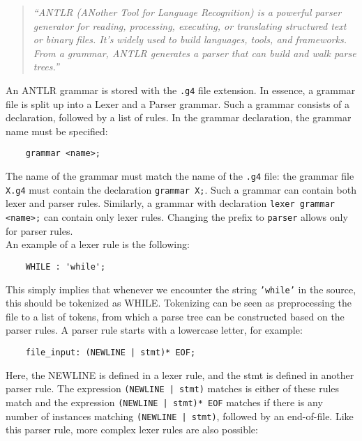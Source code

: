 \documentclass[../Main.tex]{subfiles}
\begin{document}
\begin{quote}
    \textit{``ANTLR (ANother Tool for Language Recognition) is a powerful parser generator for reading, processing, executing, or translating structured text or binary files. It's widely used to build languages, tools, and frameworks. From a grammar, ANTLR generates a parser that can build and walk parse trees.''}
\end{quote}

An ANTLR grammar is stored with the \texttt{.g4} file extension. In essence, a grammar file is split up into a Lexer and a Parser grammar. Such a grammar consists of a declaration, followed by a list of rules. In the grammar declaration, the grammar name must be specified:\\
\begin{lstlisting}
    grammar <name>;
\end{lstlisting}\vspace{15pt}
The name of the grammar must match the name of the \texttt{.g4} file: the grammar file \texttt{X.g4} must contain the declaration \texttt{grammar X;}. Such a grammar can contain both lexer and parser rules. Similarly, a grammar with declaration \texttt{lexer grammar <name>;} can contain only lexer rules. Changing the prefix to \texttt{parser} allows only for parser rules.\\

An example of a lexer rule is the following:\\
\begin{lstlisting}
    WHILE : 'while';
\end{lstlisting}\vspace{15pt}
This simply implies that whenever we encounter the string \texttt{'while'} in the source, this should be tokenized as WHILE. Tokenizing can be seen as preprocessing the file to a list of tokens, from which a parse tree can be constructed based on the parser rules. A parser rule starts with a lowercase letter, for example:\\
\begin{lstlisting}
    file_input: (NEWLINE | stmt)* EOF;
\end{lstlisting}\vspace{15pt}
Here, the NEWLINE is defined in a lexer rule, and the stmt is defined in another parser rule. The expression \texttt{(NEWLINE | stmt)} matches is either of these rules match and the expression \texttt{(NEWLINE | stmt)* EOF} matches if there is any number of instances matching \texttt{(NEWLINE | stmt)}, followed by an end-of-file. Like this parser rule, more complex lexer rules are also possible:\\
\end{document}
